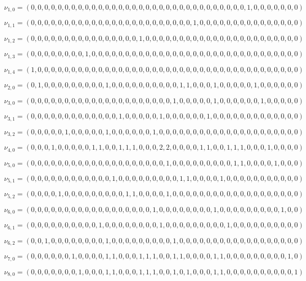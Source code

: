 \[
\nu_{1,0} = (0, 0, 0, 0, 0, 0, 0, 0, 0, 0, 0, 0, 0, 0, 0, 0, 0, 0, 0, 0, 0, 0, 0, 0, 0, 0, 0, 0, 0, 0, 0, 0, 1, 0, 0, 0, 0, 0, 0, 0)
\]

\[
\nu_{1,1} = (0, 0, 0, 0, 0, 0, 0, 0, 0, 0, 0, 0, 0, 0, 0, 0, 0, 0, 0, 0, 0, 0, 0, 0, 1, 0, 0, 0, 0, 0, 0, 0, 0, 0, 0, 0, 0, 0, 0, 0)
\]

\[
\nu_{1,2} = (0, 0, 0, 0, 0, 0, 0, 0, 0, 0, 0, 0, 0, 0, 0, 0, 1, 0, 0, 0, 0, 0, 0, 0, 0, 0, 0, 0, 0, 0, 0, 0, 0, 0, 0, 0, 0, 0, 0, 0)
\]

\[
\nu_{1,3} = (0, 0, 0, 0, 0, 0, 0, 0, 1, 0, 0, 0, 0, 0, 0, 0, 0, 0, 0, 0, 0, 0, 0, 0, 0, 0, 0, 0, 0, 0, 0, 0, 0, 0, 0, 0, 0, 0, 0, 0)
\]

\[
\nu_{1,4} = (1, 0, 0, 0, 0, 0, 0, 0, 0, 0, 0, 0, 0, 0, 0, 0, 0, 0, 0, 0, 0, 0, 0, 0, 0, 0, 0, 0, 0, 0, 0, 0, 0, 0, 0, 0, 0, 0, 0, 0)
\]

\[
\nu_{2,0} = (0, 1, 0, 0, 0, 0, 0, 0, 0, 0, 0, 1, 0, 0, 0, 0, 0, 0, 0, 0, 0, 0, 1, 1, 0, 0, 0, 1, 0, 0, 0, 0, 0, 1, 0, 0, 0, 0, 0, 0)
\]

\[
\nu_{3,0} = (0, 0, 0, 0, 0, 0, 0, 0, 0, 0, 0, 0, 0, 0, 0, 0, 0, 0, 0, 0, 0, 1, 0, 0, 0, 0, 0, 1, 0, 0, 0, 0, 0, 0, 1, 0, 0, 0, 0, 0)
\]

\[
\nu_{3,1} = (0, 0, 0, 0, 0, 0, 0, 0, 0, 0, 0, 0, 0, 1, 0, 0, 0, 0, 0, 1, 0, 0, 0, 0, 0, 0, 1, 0, 0, 0, 0, 0, 0, 0, 0, 0, 0, 0, 0, 0)
\]

\[
\nu_{3,2} = (0, 0, 0, 0, 0, 1, 0, 0, 0, 0, 0, 1, 0, 0, 0, 0, 0, 0, 1, 0, 0, 0, 0, 0, 0, 0, 0, 0, 0, 0, 0, 0, 0, 0, 0, 0, 0, 0, 0, 0)
\]

\[
\nu_{4,0} = (0, 0, 0, 1, 0, 0, 0, 0, 0, 1, 1, 0, 0, 1, 1, 1, 0, 0, 0, 2, 2, 0, 0, 0, 0, 1, 1, 0, 0, 1, 1, 1, 0, 0, 0, 1, 0, 0, 0, 0)
\]

\[
\nu_{5,0} = (0, 0, 0, 0, 0, 0, 0, 0, 0, 0, 0, 0, 0, 0, 0, 0, 0, 0, 0, 0, 1, 0, 0, 0, 0, 0, 0, 0, 0, 0, 1, 1, 0, 0, 0, 0, 1, 0, 0, 0)
\]

\[
\nu_{5,1} = (0, 0, 0, 0, 0, 0, 0, 0, 0, 0, 0, 0, 1, 0, 0, 0, 0, 0, 0, 0, 0, 0, 1, 1, 0, 0, 0, 0, 1, 0, 0, 0, 0, 0, 0, 0, 0, 0, 0, 0)
\]

\[
\nu_{5,2} = (0, 0, 0, 0, 1, 0, 0, 0, 0, 0, 0, 0, 0, 0, 1, 1, 0, 0, 0, 0, 1, 0, 0, 0, 0, 0, 0, 0, 0, 0, 0, 0, 0, 0, 0, 0, 0, 0, 0, 0)
\]

\[
\nu_{6,0} = (0, 0, 0, 0, 0, 0, 0, 0, 0, 0, 0, 0, 0, 0, 0, 0, 0, 0, 1, 0, 0, 0, 0, 0, 0, 0, 0, 1, 0, 0, 0, 0, 0, 0, 0, 0, 0, 1, 0, 0)
\]

\[
\nu_{6,1} = (0, 0, 0, 0, 0, 0, 0, 0, 0, 0, 1, 0, 0, 0, 0, 0, 0, 0, 0, 1, 0, 0, 0, 0, 0, 0, 0, 0, 0, 1, 0, 0, 0, 0, 0, 0, 0, 0, 0, 0)
\]

\[
\nu_{6,2} = (0, 0, 1, 0, 0, 0, 0, 0, 0, 0, 0, 1, 0, 0, 0, 0, 0, 0, 0, 0, 0, 1, 0, 0, 0, 0, 0, 0, 0, 0, 0, 0, 0, 0, 0, 0, 0, 0, 0, 0)
\]

\[
\nu_{7,0} = (0, 0, 0, 0, 0, 0, 1, 0, 0, 0, 0, 1, 1, 0, 0, 0, 1, 1, 1, 0, 0, 1, 1, 0, 0, 0, 0, 1, 1, 0, 0, 0, 0, 0, 0, 0, 0, 0, 1, 0)
\]

\[
\nu_{8,0} = (0, 0, 0, 0, 0, 0, 0, 1, 0, 0, 0, 1, 1, 0, 0, 0, 1, 1, 1, 0, 0, 1, 0, 1, 0, 0, 0, 1, 1, 0, 0, 0, 0, 0, 0, 0, 0, 0, 0, 1)
\]

